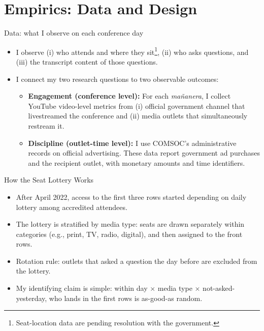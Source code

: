 \documentclass[10pt,aspectratio=169]{beamer}
\begin{document}
\section{Empirics: Data and Design}

\begin{frame}{Data: what I observe on each conference day}
\begin{itemize}
  \setlength\itemsep{0.75em}

  \item I observe (i) who attends and where they sit\footnote{\scriptsize Seat-location data are pending resolution with the government.}, (ii) who asks questions, and (iii) the transcript content of those questions.


  \item I connect my two research questions to two observable outcomes:
\begin{itemize}
\setlength\itemsep{0.45em}
  \item \textbf{Engagement (conference level):}
  For each \textit{mañanera}, I collect \alert{YouTube video-level metrics} from
  (i) official government channel that livestreamed the conference and
  (ii) media outlets that simultaneously restream it.
  
  \item \textbf{Discipline (outlet-time level):}
  I use COMSOC’s administrative records on official advertising.
  These data report government ad purchases and the recipient outlet, with monetary amounts and time identifiers.
\end{itemize}

\end{itemize}
\end{frame}

\begin{frame}{How the Seat Lottery Works}
\begin{itemize}
  \setlength\itemsep{0.8em}

  \item After April 2022, access to the \alert{first three rows} started depending on \alert{daily lottery} among accredited attendees.

  \item The lottery is \alert{stratified by media type}: seats are drawn separately within categories (e.g., print, TV, radio, digital), and then assigned to the front rows.

  \item Rotation rule: outlets that asked a question the day before are excluded from the lottery.

  \item My identifying claim is simple: \alert{within day $\times$ media type $\times$ not-asked-yesterday}, who lands in the first rows is as-good-as random.
\end{itemize}
\end{frame}
\end{document}
